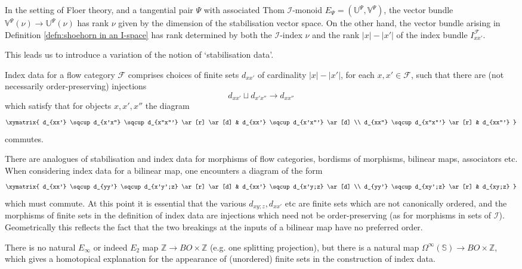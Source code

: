 \documentclass{TPmod}
\def\bS{\mathbb{S}}
\def\bU{\mathbb{U}}
\def\bV{\mathbb{V}}
\def\bZ{\mathbb{Z}}
\newcommand{\cF}{\mathcal{F}}
\newcommand{\cI}{\mathcal{I}}
\def\bZ{\mathbb{Z}}
\numberwithin{equation}{section}
\begin{document}
In the setting of Floer theory, and a tangential pair $\Psi$ with associated Thom $\cI$-monoid $E_{\Psi} = (\bU^{\Psi}, \bV^{\Psi})$, the vector bundle $\bV^{\Psi}(\nu) \to \bU^{\Psi}(\nu)$ has rank $\nu$ given by the dimension of the stabilisation vector space.  On the other hand, the vector bundle arising in Definition \ref{defn:shoehorn in an I-space} has rank determined by both the $\cI$-index $\nu$ and the rank $|x|-|x'|$ of the index bundle $I^{\cF}_{xx'}$. 


This leads us to introduce a variation of the notion of `stabilisation data'.

\begin{defn}\label{def: ind data}
    Index data for a flow category $\cF$ comprises choices of finite sets $d_{xx'}$ of cardinality $|x|-|x'|$, for each $x, x' \in \cF$, such that there are (not necessarily order-preserving) injections
    \[
    d_{xx'} \sqcup d_{x'x''} \to d_{xx''}
    \]
    which satisfy that for objects $x,x',x''$ the diagram
    \[
    \xymatrix{
    d_{xx'} \sqcup d_{x'x''} \sqcup d_{x''x'''} \ar[r] \ar[d] & d_{xx'} \sqcup d_{x'x'''} \ar[d] \\
    d_{xx''} \sqcup d_{x''x'''} \ar[r] & d_{xx'''}
    }
    \]
    commutes.
\end{defn}




\begin{rmk}\label{rmk:change order}
    There are analogues of stabilisation and index data for morphisms of flow categories, bordisms of morphisms, bilinear maps, associators etc.  When considering index data for a bilinear map, one encounters a diagram of the form
    \[
    \xymatrix{
    d_{xx'} \sqcup d_{yy'} \sqcup d_{x'y';z} \ar[r] \ar[d] & d_{xx'} \sqcup d_{x'y;z} \ar[d] \\
    d_{yy'} \sqcup d_{xy';z} \ar[r] & d_{xy;z}
    }
    \]
    which must commute. At this point it is essential that the various $d_{xy;z}, d_{xx'}$ etc are finite sets which are not canonically ordered, and the morphisms of finite sets in the definition of index data are injections which need not be order-preserving (as for morphisms in sets of $\cI$). Geometrically this reflects the fact that the two breakings at the inputs of a bilinear map have no preferred order.
\end{rmk}

\begin{rmk} There is no natural $E_\infty$ or indeed $E_2$ map $\bZ \to BO\times\bZ$ (e.g. one splitting projection), but there is a natural map $\Omega^{\infty}(\bS) \to BO \times \bZ$, which gives a homotopical explanation for the appearance of (unordered) finite sets in the construction of index data.
\end{rmk}
\end{document}
